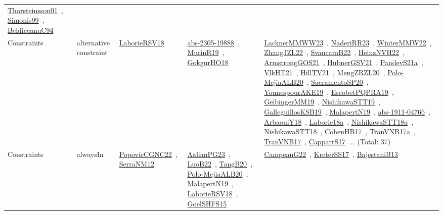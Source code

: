 {\begin{longtable}{lp{3cm}>{\raggedright\arraybackslash}p{6cm}>{\raggedright\arraybackslash}p{6cm}>{\raggedright\arraybackslash}p{8cm}}
\href{works/Thorsteinsson01.pdf}{Thorsteinsson01}~\cite{Thorsteinsson01}, \href{works/Simonis99.pdf}{Simonis99}~\cite{Simonis99}, \href{works/BeldiceanuC94.pdf}{BeldiceanuC94}~\cite{BeldiceanuC94}\\
Constraints & alternative constraint & \href{works/LaborieRSV18.pdf}{LaborieRSV18}~\cite{LaborieRSV18} & \href{works/abs-2305-19888.pdf}{abs-2305-19888}~\cite{abs-2305-19888}, \href{works/MurinR19.pdf}{MurinR19}~\cite{MurinR19}, \href{works/GokgurHO18.pdf}{GokgurHO18}~\cite{GokgurHO18} & \href{works/LacknerMMWW23.pdf}{LacknerMMWW23}~\cite{LacknerMMWW23}, \href{works/NaderiRR23.pdf}{NaderiRR23}~\cite{NaderiRR23}, \href{works/WinterMMW22.pdf}{WinterMMW22}~\cite{WinterMMW22}, \href{works/ZhangJZL22.pdf}{ZhangJZL22}~\cite{ZhangJZL22}, \href{works/SvancaraB22.pdf}{SvancaraB22}~\cite{SvancaraB22}, \href{works/HeinzNVH22.pdf}{HeinzNVH22}~\cite{HeinzNVH22}, \href{works/ArmstrongGOS21.pdf}{ArmstrongGOS21}~\cite{ArmstrongGOS21}, \href{works/HubnerGSV21.pdf}{HubnerGSV21}~\cite{HubnerGSV21}, \href{works/PandeyS21a.pdf}{PandeyS21a}~\cite{PandeyS21a}, \href{works/VlkHT21.pdf}{VlkHT21}~\cite{VlkHT21}, \href{works/HillTV21.pdf}{HillTV21}~\cite{HillTV21}, \href{works/MengZRZL20.pdf}{MengZRZL20}~\cite{MengZRZL20}, \href{works/Polo-MejiaALB20.pdf}{Polo-MejiaALB20}~\cite{Polo-MejiaALB20}, \href{works/SacramentoSP20.pdf}{SacramentoSP20}~\cite{SacramentoSP20}, \href{works/YounespourAKE19.pdf}{YounespourAKE19}~\cite{YounespourAKE19}, \href{works/EscobetPQPRA19.pdf}{EscobetPQPRA19}~\cite{EscobetPQPRA19}, \href{works/GeibingerMM19.pdf}{GeibingerMM19}~\cite{GeibingerMM19}, \href{works/NishikawaSTT19.pdf}{NishikawaSTT19}~\cite{NishikawaSTT19}, \href{works/GalleguillosKSB19.pdf}{GalleguillosKSB19}~\cite{GalleguillosKSB19}, \href{works/MalapertN19.pdf}{MalapertN19}~\cite{MalapertN19}, \href{works/abs-1911-04766.pdf}{abs-1911-04766}~\cite{abs-1911-04766}, \href{works/ArbaouiY18.pdf}{ArbaouiY18}~\cite{ArbaouiY18}, \href{works/Laborie18a.pdf}{Laborie18a}~\cite{Laborie18a}, \href{works/NishikawaSTT18a.pdf}{NishikawaSTT18a}~\cite{NishikawaSTT18a}, \href{works/NishikawaSTT18.pdf}{NishikawaSTT18}~\cite{NishikawaSTT18}, \href{works/CohenHB17.pdf}{CohenHB17}~\cite{CohenHB17}, \href{works/TranVNB17a.pdf}{TranVNB17a}~\cite{TranVNB17a}, \href{works/TranVNB17.pdf}{TranVNB17}~\cite{TranVNB17}, \href{works/CappartS17.pdf}{CappartS17}~\cite{CappartS17}... (Total: 37)\\
Constraints & alwaysIn & \href{works/PopovicCGNC22.pdf}{PopovicCGNC22}~\cite{PopovicCGNC22}, \href{works/SerraNM12.pdf}{SerraNM12}~\cite{SerraNM12} & \href{works/AalianPG23.pdf}{AalianPG23}~\cite{AalianPG23}, \href{works/LuoB22.pdf}{LuoB22}~\cite{LuoB22}, \href{works/TangB20.pdf}{TangB20}~\cite{TangB20}, \href{works/Polo-MejiaALB20.pdf}{Polo-MejiaALB20}~\cite{Polo-MejiaALB20}, \href{works/MalapertN19.pdf}{MalapertN19}~\cite{MalapertN19}, \href{works/LaborieRSV18.pdf}{LaborieRSV18}~\cite{LaborieRSV18}, \href{works/GoelSHFS15.pdf}{GoelSHFS15}~\cite{GoelSHFS15} & \href{works/CampeauG22.pdf}{CampeauG22}~\cite{CampeauG22}, \href{works/KreterSS17.pdf}{KreterSS17}~\cite{KreterSS17}, \href{works/BajestaniB13.pdf}{BajestaniB13}~\cite{BajestaniB13}\\

\end{longtable}}
